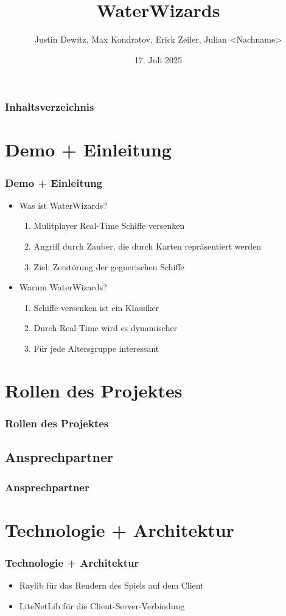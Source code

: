 \documentclass{beamer}
\title{WaterWizards}
\author{Justin Dewitz, Max Kondratov, Erick Zeiler, Julian <Nachname>}
\date{17. Juli 2025}
\begin{document}
\frame{\titlepage}

\begin{frame}
\frametitle{Inhaltsverzeichnis}
\tableofcontents
\end{frame}

\section{Demo + Einleitung}
\begin{frame}
\frametitle{Demo + Einleitung}
\begin{itemize}
  \item Was ist WaterWizards?
  \begin{enumerate}
    \item Mulitplayer Real-Time Schiffe versenken
    \item Angriff durch Zauber, die durch Karten repräsentiert werden
    \item Ziel: Zerstörung der gegnerischen Schiffe
  \end{enumerate}
  \item Warum WaterWizards?
  \begin{enumerate}
    \item Schiffe versenken ist ein Klassiker
    \item Durch Real-Time wird es dynamischer
    \item Für jede Altersgruppe interessant
  \end{enumerate}
\end{itemize}
\end{frame}

\section{Rollen des Projektes}
\begin{frame}
\frametitle{Rollen des Projektes}

\end{frame}

\subsection{Ansprechpartner}
\begin{frame}
\frametitle{Ansprechpartner}

\end{frame}

\section{Technologie + Architektur}
\begin{frame}
\frametitle{Technologie + Architektur}
  \begin{itemize}
    \item Raylib für das Rendern des Spiels auf dem Client
    \item LiteNetLib für die Client-Server-Verbindung
  \end{itemize}
\end{frame}
\end{document}
